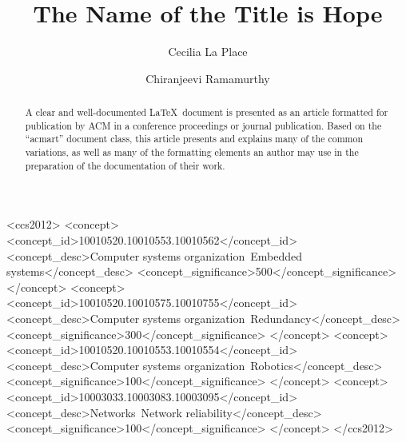 \documentclass[sigconf]{acmart}
\begin{document}
%
\title{The Name of the Title is Hope}

%
\author{Cecilia La Place}
\author{Chiranjeevi Ramamurthy}
\authornotemark[1]

%
\renewcommand{\shortauthors}{La Place and Ramamurthy}

%
\begin{abstract}
A clear and well-documented \LaTeX\ document is presented as an article formatted for publication by ACM in 
a conference proceedings or journal publication. Based on the ``acmart'' document class, this article presents
and explains many of the common variations, as well as many of the formatting elements
an author may use in the preparation of the documentation of their work.
\end{abstract}

%
%
\begin{CCSXML}
<ccs2012>
 <concept>
  <concept_id>10010520.10010553.10010562</concept_id>
  <concept_desc>Computer systems organization~Embedded systems</concept_desc>
  <concept_significance>500</concept_significance>
 </concept>
 <concept>
  <concept_id>10010520.10010575.10010755</concept_id>
  <concept_desc>Computer systems organization~Redundancy</concept_desc>
  <concept_significance>300</concept_significance>
 </concept>
 <concept>
  <concept_id>10010520.10010553.10010554</concept_id>
  <concept_desc>Computer systems organization~Robotics</concept_desc>
  <concept_significance>100</concept_significance>
 </concept>
 <concept>
  <concept_id>10003033.10003083.10003095</concept_id>
  <concept_desc>Networks~Network reliability</concept_desc>
  <concept_significance>100</concept_significance>
 </concept>
</ccs2012>
\end{CCSXML}
\end{document}
